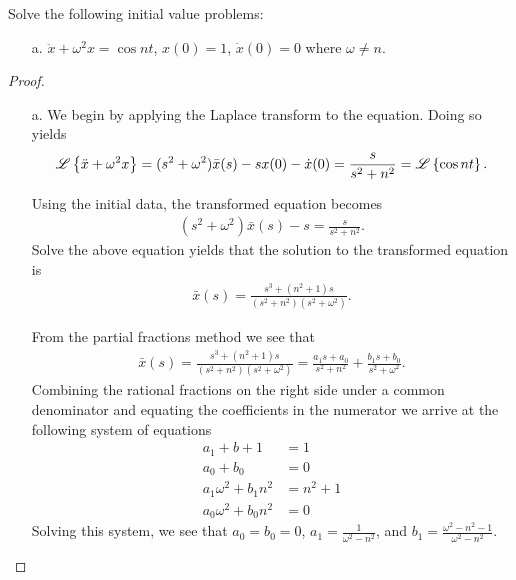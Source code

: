 \begin{problem}{4.12}
  Solve the following initial value problems:
  \begin{enumerate}
    \item[a.] $\ddot{x} + \omega^2 x = \cos nt$, $x(0) = 1$, $\dot{x}(0) = 0$ where $\omega \neq n$.
  \end{enumerate}
\end{problem}

\begin{proof}
  \begin{enumerate}
    \item[a.] We begin by applying the Laplace transform to the equation. Doing
      so yields
      \begin{align*}
        \mathscr{L}\left\{ {\ddot{x} + \omega^2 x} \right\} = (s^2 + \omega^2)\bar{x}(s) -sx(0) - \dot{x}(0) = \frac{s}{s^2 + n^2} = \mathscr{L}\left\{ {\cos nt} \right\}.
      \end{align*}

      Using the initial data, the transformed equation becomes
      \begin{align*}
        (s^2 + \omega^2)\bar{x}(s) -s = \frac{s}{s^2 + n^2}.
      \end{align*}
      Solve the above equation yields that the solution to the transformed equation is
      \begin{align*}
        \bar{x}(s) = \frac{s^3+(n^2+1)s}{(s^2 + n^2)(s^2+\omega^2)}.
      \end{align*}

      From the partial fractions method we see that
      \begin{align*}
        \bar{x}(s) = \frac{s^3+(n^2+1)s}{(s^2 + n^2)(s^2+\omega^2)} = \frac{a_1 s + a_0}{s^2 + n^2} + \frac{b_1 s + b_0}{s^2 + \omega^2}.
      \end{align*}
      Combining the rational fractions on the right side under a common denominator and equating the coefficients in the numerator
      we arrive at the following system of equations
      \begin{align*}
        a_1 + b+1 &= 1 \\
        a_0 + b_0 &= 0 \\
        a_1\omega^2 + b_1 n^2 &= n^2 + 1 \\
        a_0\omega^2 + b_0n^2 &= 0
      \end{align*}
      Solving this system, we see that $a_0 = b_0 = 0$, $\displaystyle a_1 = \frac{1}{\omega^2 - n^2}$,
      and $\displaystyle b_1 = \frac{\omega^2 - n^2 -1}{\omega^2 - n^2}$.


\end{enumerate}
\end{proof}
